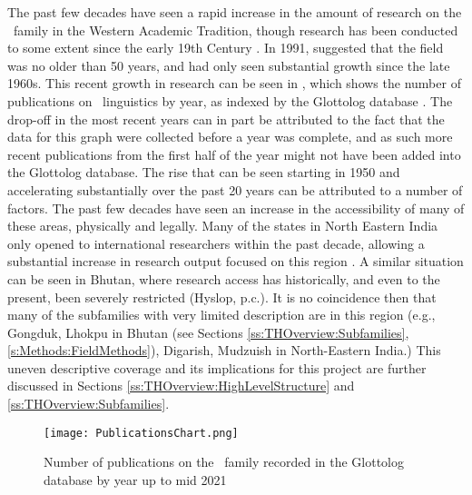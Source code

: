 The past few decades have seen a rapid increase in the amount of research on the \lfam\ family in the Western Academic Tradition, though research has been conducted to some extent since the early 19th Century \cite{VanDriem2014}. In 1991,  suggested that the field was no older than 50 years, and had only seen substantial growth since the late 1960s. This recent growth in research can be seen in , which shows the number of publications on \lfam\ linguistics by year, as indexed by the Glottolog database \cite{glottolog}. The drop-off in the most recent years can in part be attributed to the fact that the data for this graph were collected before a year was complete, and as such more recent publications from the first half of the year might not have been added into the Glottolog database. The rise that can be seen starting in 1950 and accelerating substantially over the past 20 years can be attributed to a number of factors. The past few decades have seen an increase in the accessibility of many of these areas, physically and legally. Many of the states in North Eastern India only opened to international researchers within the past decade, allowing a substantial increase in research output focused on this region \cite{BlenchPost2014}. A similar situation can be seen in Bhutan, where research access has historically, and even to the present, been severely restricted (Hyslop, p.c.). It is no coincidence then that many of the subfamilies with very limited description are in this region (e.g., Gongduk, Lhokpu in Bhutan (see Sections \ref{ss:THOverview:Subfamilies}, \ref{s:Methods:FieldMethods}), Digarish, Mudzuish in North-Eastern India.) This uneven descriptive coverage and its implications for this project are further discussed in Sections \ref{ss:THOverview:HighLevelStructure} and \ref{ss:THOverview:Subfamilies}.


\begin{figure}

\centering
\texttt{[image: PublicationsChart.png]}
\caption{Number of publications on the \lfam\ family recorded in the Glottolog database by year up to mid 2021 \cite{glottolog}}
\label{fig:PublicationsChart}
\end{figure}


